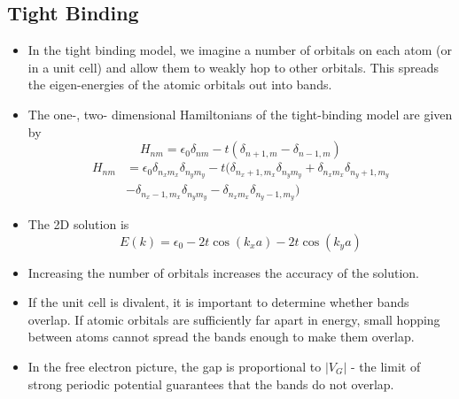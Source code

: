 \documentclass[10pt]{article}
\begin{document}
\subsection{Tight Binding}
\begin{itemize}
  \item In the tight binding model, we imagine a number of orbitals on each atom (or in a unit cell) and allow them to weakly
  hop to other orbitals. This spreads the eigen-energies of the atomic orbitals out into bands.
  \item The one-, two-  dimensional Hamiltonians of the tight-binding model are given by
  \begin{equation}
    H_{nm} = \epsilon_{0}\delta_{nm} - t(\delta_{n+1,m} - \delta_{n-1,m})
  \end{equation}
  \begin{equation}
    \begin{aligned}
    H_{nm} & = \epsilon_{0}\delta_{n_{x}m_{x}}\delta_{n_{y}m_{y}} - t(\delta_{n_{x}+1, m_{x}}\delta_{n_{y}m_{y}} + \delta_{n_{x}m_{x}}\delta_{n_{y}+1, m_{y}} \\
    & - \delta_{n_{x}-1, m_{x}}\delta_{n_{y}m_{y}} - \delta_{n_{x}m_{x}}\delta_{n_{y}-1, m_{y}})
  \end{aligned}
  \end{equation}
  \item The 2D solution is
  $$
  E(k) = \epsilon_{0} - 2t\cos(k_{x}a)-2t\cos(k_{y} a)
  $$
  \item Increasing the number of orbitals increases the accuracy of the solution.
  \item If the unit cell is divalent, it is important to determine whether bands overlap. If atomic orbitals are sufficiently far
  apart in energy, small hopping between atoms cannot spread the bands enough to make them overlap.
  \item In the free electron picture, the gap is proportional to $|V_{G}|$ - the limit of strong periodic potential guarantees
  that the bands do not overlap.
\end{itemize}
\end{document}
